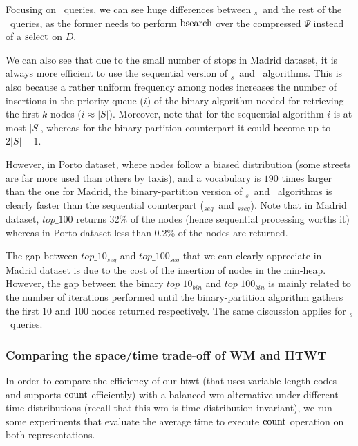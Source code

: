 	Focusing on \topK\ queries, we can see huge differences between \topK$_s$\  
	and the rest of the \topK\ queries, as the former needs to perform {$ \operatorname{bsearch}$} over the compressed $\Psi$
	instead of a $\operatorname{select}$ on $D$. 

	We can also see that due to the small number of stops in Madrid dataset, it is always more efficient to use the sequential version of \topK$_s$\ and \topK\ algorithms. This is also because a rather uniform frequency among nodes 
	increases the number of insertions in the priority queue ($i$) of the binary algorithm
	needed for retrieving the first $k$ nodes ($i \approx |S|$). Moreover, note that for the sequential algorithm $i$ is at most $|S|$, whereas for the binary-partition counterpart it could become up to $2|S|-1$.

	However, in Porto dataset, where nodes follow a biased distribution (some streets are far more used than others by taxis), and a vocabulary 
	is $190$ times larger than the one for Madrid, the binary-partition version of \topK$_s$\ and \topK\ algorithms is clearly
	faster than the sequential counterpart (\topK$_{seq}$\ and \topK$_{sseq}$).
	Note that in Madrid dataset, $top\_100$ returns 32\% of the nodes (hence sequential processing worths it) 
	whereas in Porto dataset less than 0.2\% of the nodes are returned. 

	The gap between $top\_10_{seq}$ and $top\_100_{seq}$ that we can clearly appreciate in Madrid dataset 
	is due to the cost of the insertion of nodes in the min-heap. However, the gap between 
	the binary $top\_10_{bin}$ and $top\_100_{bin}$ 
	is mainly related to the number of iterations performed until the binary-partition algorithm gathers the first
	$10$ and $100$ {nodes}  returned respectively. The same discussion applies for \topK$_s$\ queries.


	\subsubsection{Comparing the space/time trade-off of WM and HTWT}
	\label{sec:ctr:exp:queries:wt}
	In order to compare the efficiency of our \gls{htwt} (that uses variable-length codes and supports $\operatorname{count}$ efficiently) with a balanced \gls{wm} alternative under 
	different time distributions (recall that this \gls{wm} is time distribution invariant), 
	we run some experiments that evaluate the average time to execute $\operatorname{count}$ operation on
	both representations.


